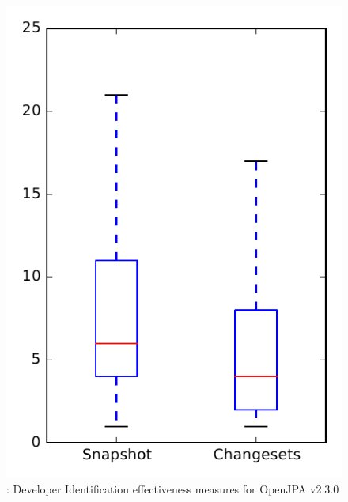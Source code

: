 
\begin{figure}
\centering
\includegraphics[height=0.4\textheight]{figures/dit/rq1_openjpa_no_outlier}
\caption{\done: Developer Identification effectiveness measures for OpenJPA v2.3.0}
\label{fig:dit:rq1:openjpa}
\end{figure}
